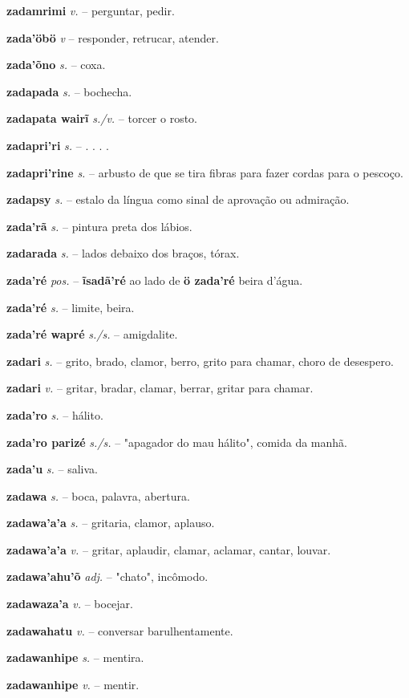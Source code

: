\textbf{zadamrimi} \textit{v.} -- perguntar, pedir.

\textbf{zada'öbö} \textit{v} -- responder, retrucar, atender.

\textbf{zada'õno} \textit{s.} -- coxa.

\textbf{zadapada} \textit{s.} -- bochecha.

\textbf{zadapata wairĩ} \textit{s./v.} -- torcer o rosto.

\textbf{zadapri'ri} \textit{s.} -- . . . .

\textbf{zadapri'rine} \textit{s.} -- arbusto de que se tira fibras para fazer cordas para o pescoço.

\textbf{zadapsy} \textit{s.} -- estalo da língua como sinal de aprovação ou admiração.

\textbf{zada'rã} \textit{s.} -- pintura preta dos lábios.

\textbf{zadarada} \textit{s.} -- lados debaixo dos braços, tórax.

\textbf{zada'ré} \textit{pos.} -- \textbf{ĩsadã'ré} ao lado de  \textbf{ö zada'ré} beira d'água.

\textbf{zada'ré} \textit{s.} -- limite, beira.

\textbf{zada'ré wapré} \textit{s./s.} -- amigdalite.

\textbf{zadari} \textit{s.} -- grito, brado, clamor, berro, grito para chamar, choro de desespero.

\textbf{zadari} \textit{v.} -- gritar, bradar, clamar, berrar, gritar para chamar.

\textbf{zada'ro} \textit{s.} -- hálito.

\textbf{zada'ro parizé} \textit{s./s.} -- "apagador do mau hálito", comida da manhã.

\textbf{zada'u} \textit{s.} -- saliva.

\textbf{zadawa} \textit{s.} -- boca, palavra, abertura.

\textbf{zadawa'a'a} \textit{s.} -- gritaria, clamor, aplauso.

\textbf{zadawa'a'a} \textit{v.} -- gritar, aplaudir, clamar, aclamar, cantar, louvar.

\textbf{zadawa'ahu'õ} \textit{adj.} -- "chato", incômodo.

\textbf{zadawaza'a} \textit{v.} -- bocejar.

\textbf{zadawahatu} \textit{v.} -- conversar barulhentamente.

\textbf{zadawanhipe} \textit{s.} -- mentira.

\textbf{zadawanhipe} \textit{v.} -- mentir.

